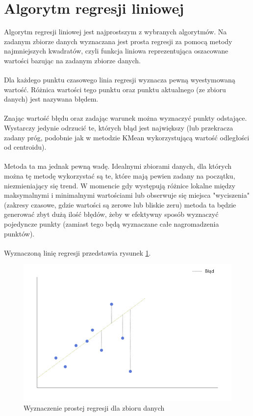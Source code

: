 \documentclass[eng,printmode]{mgr}
\begin{document}
\section{Algorytm regresji liniowej}
\label{sec:reg}
Algorytm regresji liniowej jest najprostszym z wybranych algorytmów. Na zadanym zbiorze danych wyznaczana jest prosta regresji za pomocą metody najmniejszych kwadratów, czyli funkcja liniowa reprezentująca oszacowane wartości bazując na zadanym zbiorze danych. 
\\\\
Dla każdego punktu czasowego linia regresji wyznacza pewną wyestymowaną wartość. Różnica wartości tego punktu oraz punktu aktualnego (ze zbioru danych) jest nazywana błędem.
\\\\
Znając wartość błędu oraz zadając warunek można wyznaczyć punkty odstające. Wystarczy jedynie odrzucić te, których błąd jest największy (lub przekracza zadany próg, podobnie jak w metodzie KMean wykorzystującą wartość odległości od centroidu).
\\\\
Metoda ta ma jednak pewną wadę. Idealnymi zbiorami danych, dla których można tę metodę wykorzystać są te, które mają pewien zadany na początku, niezmieniający się trend. W momencie gdy występują różnice lokalne między maksymalnymi i minimalnymi wartościami lub obserwuje się miejsca "wyciszenia" (zakresy czasowe, gdzie wartości są zerowe lub bliskie zeru) metoda ta będzie generować zbyt dużą ilość błędów, żeby w efektywny sposób wyznaczyć pojedyncze punkty (zamiast tego będą wyznaczane całe nagromadzenia punktów).
\\\\
Wyznaczoną linię regresji przedstawia rysunek \ref{fig:linear_reg}.

\begin{figure}[H]
  \begin{center}
  \includegraphics[scale=0.7]{linear_reg}
  \end{center}
  \caption{Wyznaczenie prostej regresji dla zbioru danych}
  \label{fig:linear_reg}
\end{figure}
\end{document}
